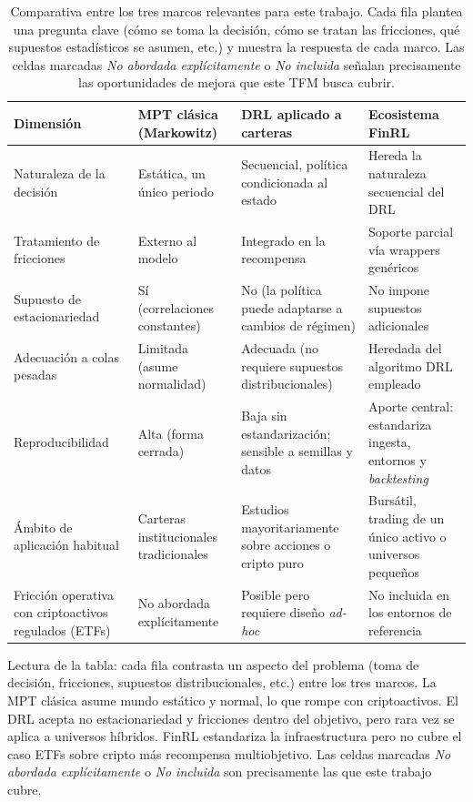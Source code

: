 \documentclass[IB,a4paper]{TFUOC}
\begin{document}
\begin{table}[h]
\centering
\renewcommand{\arraystretch}{1.25}
\begin{tabular}{|p{3.0cm}|p{3.7cm}|p{3.7cm}|p{3.7cm}|}
\hline
\textbf{Dimensión} & \textbf{MPT clásica (Markowitz)} & \textbf{DRL aplicado a carteras} & \textbf{Ecosistema FinRL} \\ \hline
Naturaleza de la decisión & Estática, un único periodo & Secuencial, política condicionada al estado & Hereda la naturaleza secuencial del DRL \\ \hline
Tratamiento de fricciones & Externo al modelo & Integrado en la recompensa & Soporte parcial vía wrappers genéricos \\ \hline
Supuesto de estacionariedad & Sí (correlaciones constantes) & No (la política puede adaptarse a cambios de régimen) & No impone supuestos adicionales \\ \hline
Adecuación a colas pesadas & Limitada (asume normalidad) & Adecuada (no requiere supuestos distribucionales) & Heredada del algoritmo DRL empleado \\ \hline
Reproducibilidad & Alta (forma cerrada) & Baja sin estandarización; sensible a semillas y datos & Aporte central: estandariza ingesta, entornos y \textit{backtesting} \\ \hline
Ámbito de aplicación habitual & Carteras institucionales tradicionales & Estudios mayoritariamente sobre acciones o cripto puro & Bursátil, trading de un único activo o universos pequeños \\ \hline
Fricción operativa con criptoactivos regulados (ETFs) & No abordada explícitamente & Posible pero requiere diseño \textit{ad-hoc} & No incluida en los entornos de referencia \\ \hline
\end{tabular}
\caption[Comparativa entre Markowitz, DRL y FinRL.]{Comparativa entre los tres marcos relevantes para este trabajo. Cada fila plantea una pregunta clave (cómo se toma la decisión, cómo se tratan las fricciones, qué supuestos estadísticos se asumen, etc.) y muestra la respuesta de cada marco. Las celdas marcadas \textit{No abordada explícitamente} o \textit{No incluida} señalan precisamente las oportunidades de mejora que este TFM busca cubrir.}
\label{tab:comparativa_paradigmas}
\end{table}

\noindent Lectura de la tabla: cada fila contrasta un aspecto del problema (toma de decisión, fricciones, supuestos distribucionales, etc.) entre los tres marcos. La MPT clásica asume mundo estático y normal, lo que rompe con criptoactivos. El DRL acepta no estacionariedad y fricciones dentro del objetivo, pero rara vez se aplica a universos híbridos. FinRL estandariza la infraestructura pero no cubre el caso ETFs sobre cripto más recompensa multiobjetivo. Las celdas marcadas \textit{No abordada explícitamente} o \textit{No incluida} son precisamente las que este trabajo cubre.
\end{document}

